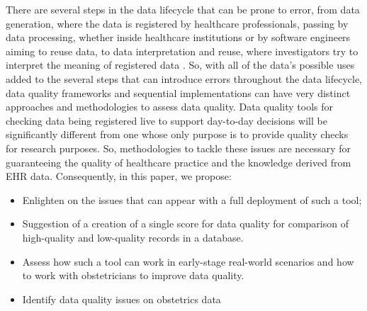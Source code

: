 There are several steps in the data lifecycle that can be prone to error, from data generation, where the data is registered by healthcare professionals, passing by data processing, whether inside healthcare institutions or by software engineers aiming to reuse data, to data interpretation and reuse, where investigators try to interpret the meaning of registered data \cite{wengClinicalDataQuality2020}.
So, with all of the data's possible uses added to the several steps that can introduce errors throughout the data lifecycle, data quality frameworks and sequential implementations can have very distinct approaches and methodologies to assess data quality. Data quality tools for checking data being registered live to support day-to-day decisions will be significantly different from one whose only purpose is to provide quality checks for research purposes. So, methodologies to tackle these issues are necessary for guaranteeing the quality of healthcare practice and the knowledge derived from EHR data. Consequently, in this paper, we propose:
\begin{itemize}
    \item Enlighten on the issues that can appear with a full deployment of such a tool;
    \item Suggestion of a creation of a single score for data quality for comparison of high-quality and low-quality records in a database.
    \item Assess how such a tool can work in early-stage real-world scenarios and how to work with obstetricians to improve data quality.
    \item Identify data quality issues on obstetrics data
\end{itemize}




